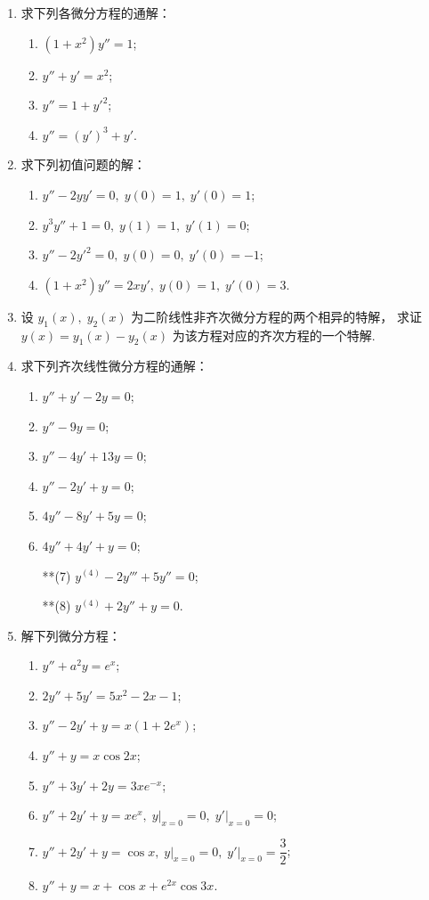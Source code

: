 \begin{enumerate}\setlength{\itemsep}{7pt}
    \item 求下列各微分方程的通解：
    \begin{enumerate}[(1)]\setlength{\itemsep}{5pt}\setlength{\topsep}{15pt}
        \item $(1+x^2)y''=1$;
        \item $y''+y'=x^2$;
        \item $y''=1+y'^2$;
        \item $y''=(y')^3+y'$.
    \end{enumerate}

    \item 求下列初值问题的解：
    \begin{enumerate}[(1)]\setlength{\itemsep}{5pt}\setlength{\topsep}{15pt}
        \item $y''-2yy'=0,\;y(0)=1,\;y'(0)=1$;
        \item $y^3y''+1=0,\;y(1)=1,\;y'(1)=0$;
        \item $y''-2y'^2=0,\;y(0)=0,\;y'(0)=-1$;
        \item $(1+x^2)y''=2xy',\;y(0)=1,\;y'(0)=3$.
    \end{enumerate}

    \item 设 $y_1(x),\;y_2(x)$ 为二阶线性非齐次微分方程的两个相异的特解，
    求证 $y(x)=y_1(x)-y_2(x)$ 为该方程对应的齐次方程的一个特解.

    \item 求下列齐次线性微分方程的通解：
    \begin{enumerate}[(1)]\setlength{\itemsep}{5pt}\setlength{\topsep}{15pt}
        \item $y''+y'-2y=0$;
        \item $y''-9y=0$;
        \item $y''-4y'+13y=0$;
        \item $y''-2y'+y=0$;
        \item $4y''-8y'+5y=0$;
        \item $4y''+4y'+y=0$;
        \item[**(7)] $y^{(4)}-2y'''+5y''=0$;
        \item[**(8)] $y^{(4)}+2y''+y=0$. 
    \end{enumerate}

    \item 解下列微分方程：
    \begin{enumerate}[(1)]\setlength{\itemsep}{5pt}\setlength{\topsep}{15pt}
        \item $y''+a^2y=e^x$;
        \item $2y''+5y'=5x^2-2x-1$;
        \item $y''-2y'+y=x(1+2e^x)$;
        \item $y''+y=x\cos 2x$;
        \item $y''+3y'+2y=3xe^{-x}$;
        \item $y''+2y'+y=xe^x,\;y\big|_{x=0}=0,\;y'\big|_{x=0}=0$;
        \item $y''+2y'+y=\cos x,\;y\big|_{x=0}=0,\;y'\big|_{x=0}=\dfrac{3}{2}$;
        \item $y''+y=x+\cos x+e^{2x}\cos 3x$.
    \end{enumerate}


\end{enumerate}
